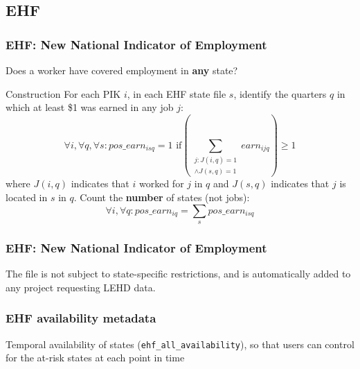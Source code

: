 \documentclass[aspectratio=169]{beamer}
\begin{document}
\subsection{EHF}
\begin{frame}
\frametitle{\ac{EHF}: New National Indicator of Employment}
Does a worker have covered employment in \textbf{any} state?

\begin{block}{Construction}
\small For each PIK $i$, in each EHF state file $s$, identify the  quarters $q$ in which at least \$1 was earned in any job $j$:
$$
\forall i, \forall q, \forall s: pos\_earn_{isq} = 1 \text{\ if} \left ( \sum_{\substack{j: J(i,q)=1 \\ \land J(s,q) = 1}} earn_{ijq}  \right ) \geq 1
$$
where $J(i,q)$ indicates that $i$ worked for $j$ in $q$ and $J(s,q)$ indicates that $j$ is located in $s$ in $q$. 
Count the \textbf{number} of states (not jobs):
$$
\forall i, \forall q: pos\_earn_{iq} = \sum_{s} pos\_earn_{isq}
$$
\end{block}
\end{frame}

\begin{frame}
\frametitle{\ac{EHF}: New National Indicator of Employment}
The file is not subject to state-specific restrictions, and is automatically added to any project requesting LEHD data.
\end{frame}

\begin{frame}
\frametitle{EHF availability metadata}

Temporal availability of states  (\texttt{ehf\_all\_availability}), so that users can control for the at-risk states at each point in time 
\end{frame}

\end{document}
